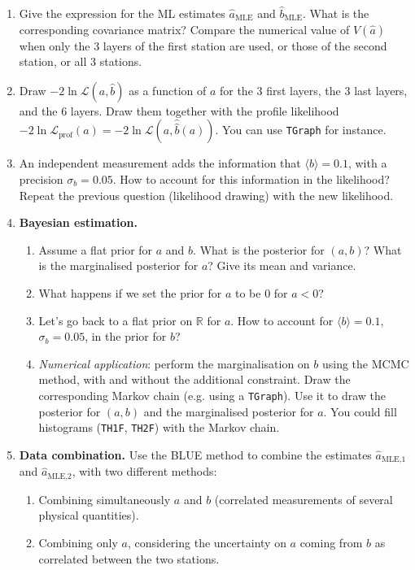 \documentclass[a4paper,12pt]{article}
\begin{document}
 \begin{enumerate}
  \item Give the expression for the ML estimates $\hat{a}_\text{MLE}$ and $\hat{b}_\text{MLE}$. What is the corresponding covariance matrix? Compare the numerical value of $V(\hat{a})$
  when only the 3 layers of the first station are used, or those of the second station, or all 3 stations.
  \item Draw $-2\ln\mathcal{L}(a,\hat{b})$ as a function of $a$ for the 3 first layers, the 3 last layers, and the 6 layers. Draw them together with the profile likelihood 
  $-2\ln\mathcal{L}_\text{prof}(a) = -2\ln\mathcal{L}(a,\hat{\hat{b}}(a))$. You can use \texttt{TGraph} for instance.
  \item An independent measurement adds the information that $\langle b \rangle = 0.1$, with a precision $\sigma_b = 0.05$. How to account for this information in the likelihood?
  Repeat the previous question (likelihood drawing) with the new likelihood.
  \item \textbf{Bayesian estimation.} 
  \begin{enumerate}
    \item Assume a flat prior for $a$ and $b$. What is the posterior for $(a,b)$? What is the marginalised posterior for $a$? Give its mean and variance.
    \item What happens if we set the prior for $a$ to be 0 for $a<0$?
    \item Let's go back to a flat prior on $\mathbb{R}$ for $a$. How to account for $\langle b \rangle = 0.1$, $\sigma_b = 0.05$, in the prior for $b$?
    \item \textit{Numerical application}: perform the marginalisation on $b$ using the MCMC method, with and without the additional constraint. Draw the corresponding Markov chain
    (e.g. using a \texttt{TGraph}).
    Use it to draw the posterior for $(a,b)$ and the marginalised posterior for $a$. You could fill histograms (\texttt{TH1F}, \texttt{TH2F}) with the Markov chain.
  \end{enumerate}
  \item \textbf{Data combination.} Use the BLUE method to combine the estimates $\hat{a}_\text{MLE,1}$ and $\hat{a}_\text{MLE,2}$, with two different methods:
  \begin{enumerate}
   \item Combining simultaneously $a$ and $b$ (correlated measurements of several physical quantities).
   \item Combining only $a$, considering the uncertainty on $a$ coming from $b$ as correlated between the two stations.
  \end{enumerate}
 \end{enumerate}
\end{document}
